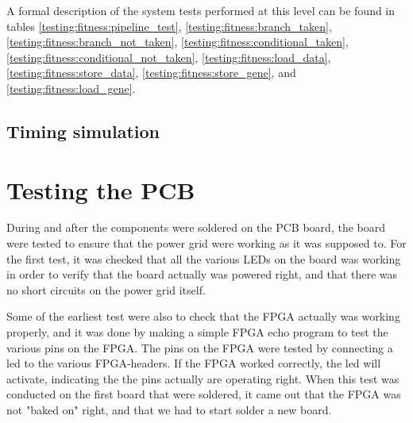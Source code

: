 
A formal description of the system tests performed at this level can be found in tables
\ref{testing:fitness:pipeline_test},
\ref{testing:fitness:branch_taken},
\ref{testing:fitness:branch_not_taken},
\ref{testing:fitness:conditional_taken},
\ref{testing:fitness:conditional_not_taken},
\ref{testing:fitness:load_data},
\ref{testing:fitness:store_data},
\ref{testing:fitness:store_gene},
and
\ref{testing:fitness:load_gene}.














\subsection{Timing simulation}





\section{Testing the PCB}
During and after the components were soldered on the PCB board, the board were tested to ensure that the power grid were working as it was supposed to.
For the first test, it was checked that all the various LEDs on the board was working in order to verify that the board actually was powered right, and that there was
no short circuits on the power grid itself.

Some of the earliest test were also to check that the FPGA actually was working properly, and it was done by making a simple FPGA echo program to test the various pins on the FPGA.
The pins on the FPGA were tested by connecting a led to the various FPGA-headers. If the FPGA worked correctly, the led will activate, indicating the the pins actually are operating right.
When this test was conducted on the first board that were soldered, it came out that the FPGA was not "baked on" right, and that we had to start solder a new board. 


